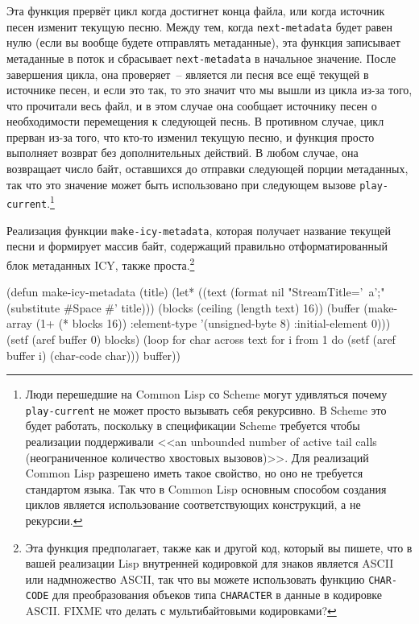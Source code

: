 Эта функция прервёт цикл когда достигнет конца файла, или когда источник песен изменит
текущую песню.  Между тем, когда \lstinline{next-metadata} будет равен нулю (если вы вообще
будете отправлять метаданные), эта функция записывает метаданные в поток и сбрасывает
\lstinline{next-metadata} в начальное значение.  После завершения цикла, она проверяет~--
является ли песня все ещё текущей в источнике песен, и если это так, то это значит что мы
вышли из цикла из-за того, что прочитали весь файл, и в этом случае она сообщает источнику
песен о необходимости перемещения к следующей песнь.  В противном случае, цикл прерван
из-за того, что кто-то изменил текущую песню, и функция просто выполняет возврат без
дополнительных действий.  В любом случае, она возвращает число байт, оставшихся до
отправки следующей порции метаданных, так что это значение может быть использовано при
следующем вызове \lstinline{play-current}.\footnote{Люди перешедшие на Common Lisp со Scheme
  могут удивляться почему \lstinline{play-current} не может просто вызывать себя рекурсивно.  В
  Scheme это будет работать, поскольку в спецификации Scheme требуется чтобы реализации
  поддерживали <<an unbounded number of active tail calls (неограниченное количество
  хвостовых вызовов)>>.  Для реализаций Common Lisp разрешено иметь такое свойство, но оно
  не требуется стандартом языка.  Так что в Common Lisp основным способом создания циклов
  является использование соответствующих конструкций, а не рекурсии.}

Реализация функции \lstinline{make-icy-metadata}, которая получает название текущей песни и
формирует массив байт, содержащий правильно отформатированный блок метаданных ICY, также
проста.\footnote{Эта функция предполагает, также как и другой код, который вы пишете, что
  в вашей реализации Lisp внутренней кодировкой для знаков является ASCII или надмножество
  ASCII, так что вы можете использовать функцию \lstinline{CHAR-CODE} для преобразования
  объеков типа \lstinline{CHARACTER} в данные в кодировке ASCII. FIXME что делать с
  мультибайтовыми кодировками?}

\begin{myverb}
(defun make-icy-metadata (title)
  (let* ((text (format nil "StreamTitle='~a';" (substitute #\bslash{}Space #\bslash{}' title)))
         (blocks (ceiling (length text) 16))
         (buffer (make-array (1+ (* blocks 16))
                             :element-type '(unsigned-byte 8)
                             :initial-element 0)))
    (setf (aref buffer 0) blocks)
    (loop 
       for char across text
       for i from 1 
       do (setf (aref buffer i) (char-code char)))
    buffer))
\end{myverb}

